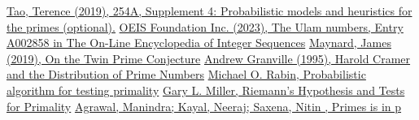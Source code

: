 \documentclass[conference]{IEEEtran}
\begin{document}
\begin{thebibliography}{00}
     \href{https://terrytao.wordpress.com/2015/01/04/254a-supplement-4-probabilistic-models-and-heuristics-for-the-primes-optional.}{Tao, Terence (2019), 254A, Supplement 4: Probabilistic models and heuristics for the primes (optional).}
     \href{https://oeis.org/A002858}{OEIS Foundation Inc. (2023), The Ulam numbers, Entry A002858 in The On-Line Encyclopedia of Integer Sequences}
     \href{https://arxiv.org/abs/1910.14674}{Maynard, James (2019), On the Twin Prime Conjecture}
     \href{https://chance.dartmouth.edu/chance_news/for_chance_news/Riemann/cramer.pdf}{Andrew Granville (1995), Harold Cramer and the Distribution of Prime Numbers}
    \href{https://doi.org/10.1016%2F0022-314X%2880%2990084-0}{Michael O. Rabin, Probabilistic algorithm for testing primality}
    \href{https://doi.org/10.1145%2F800116.803773}{Gary L. Miller, Riemann's Hypothesis and Tests for Primality}
    \href{https://doi.org/10.4007%2Fannals.2004.160.781}{Agrawal, Manindra; Kayal, Neeraj; Saxena, Nitin , Primes is in p}
\end{thebibliography}
\vspace{12pt}
\end{document}
